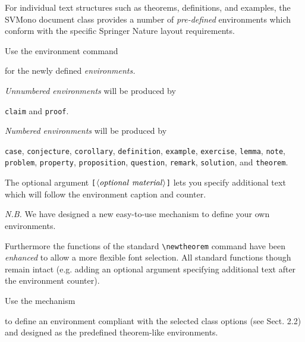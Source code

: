 \documentclass[graybox,square]{svmono}
\begin{document}
\begin{sloppy}
For individual text structures such as theorems, definitions, and examples, the {\sc SVMono} document class provides a number of {\it pre-defined} environments which conform with the specific Springer Nature layout requirements.

Use the environment command

\cprotect{}

for the newly defined {\it environments.}

{\it Unnumbered environments} will be produced by

\verb|claim| and \verb|proof|.

{\it Numbered environments} will be produced by

{\tt case}, {\tt conjecture}, {\tt corollary}, {\tt definition}, {\tt example}, {\tt exercise}, {\tt lemma}, {\tt note}, {\tt problem}, {\tt property}, {\tt proposition}, {\tt question}, {\tt remark}, {\tt solution}, and {\tt theorem}.

The optional argument \verb|[|$\langle {\it optional~material}\rangle$\verb|]| lets you specify additional text which will follow the environment caption and counter.

{\it N.B.} We have designed a new easy-to-use mechanism to define your own environments.

Furthermore the functions of the standard \verb|\newtheorem| command have been {\it enhanced} to allow a more flexible font selection. All standard functions though remain intact (e.g. adding an optional argument specifying additional text after the environment counter).

Use the mechanism

\cprotect{}

to define an environment compliant with the selected class options (see Sect. 2.2) and designed as the predefined theorem-like environments.


\end{sloppy}
\end{document}
